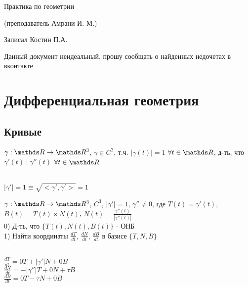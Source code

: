 \documentclass[12pt, fleqn]{article}
\begin{document}
\begin{center}
  \huge Практика по геометрии

  (преподаватель Амрани И. М.)

  \large Записал Костин П.А.
\end{center}

Данный документ неидеальный, прошу сообщать о найденных недочетах в \href{https://vk.com/drab_existence_a}{вконтакте}
\tableofcontents
\newpage

\section{Дифференциальная геометрия}
\subsection{Кривые}
\begin{instance}
    $\gamma: \R \ra \R^3$, $\gamma \in C^2$, т.ч.  $|\gamma(t)|=1$ $\forall t \in \R$, д-ть, что $\gamma'(t) \bot \gamma''(t)$ $\forall t \in \R$
\end{instance}

\begin{proofs} \ \\
    $|\gamma'|=1 \equiv \sqrt{<\gamma',\gamma'>}=1$
\end{proofs}

\begin{instance}
    $\gamma: \R \ra \R^3$, $C^3$, $|\gamma'|=1$, $\gamma'' \neq 0$, где $T(t)=\gamma'(t)$, $B(t)=T(t) \times N(t)$, $N(t)=\frac{\gamma''(t)}{|\gamma''(t)|}$\\
    0) Д-ть, что $\{T(t), N(t),B(t) \}$ - ОНБ\\
    1) Найти координаты $\frac{dT}{dt}$, $\frac{dN}{dt}$, $\frac{dB}{dt}$ в базисе $\{T,N,B\}$
\end{instance}

\begin{proofs}\\
    $\frac{dT}{dt}=0T+|\gamma'|N+0B$\\
    $\frac{dN}{dt}=-|\gamma''|T+0N+\tau B$\\
    $\frac{dB}{dt}=0T-\tau N+0B$\\
\end{proofs}
\end{document}
